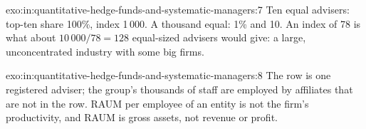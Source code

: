 \begin{solution}{exo:in:quantitative-hedge-funds-and-systematic-managers:7}
Ten equal advisers: top-ten share 100\%, index 1\,000. A thousand equal: 1\% and 10. An index of 78 is what about
$10\,000/78=128$ equal-sized advisers would give: a large, unconcentrated industry with some big firms.
\end{solution}

\begin{solution}{exo:in:quantitative-hedge-funds-and-systematic-managers:8}
The row is one registered adviser; the group's thousands of staff are employed by affiliates that are not in the row.
RAUM per employee of an entity is not the firm's productivity, and RAUM is gross assets, not revenue or profit.
\end{solution}

